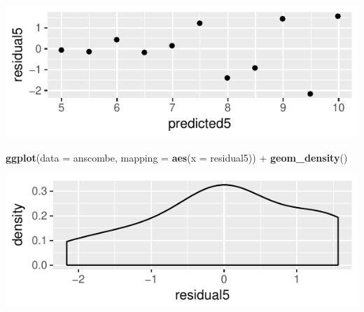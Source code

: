\documentclass[]{article}
\newenvironment{Shaded}{\begin{snugshade}}{\end{snugshade}}
\newcommand{\KeywordTok}[1]{\textcolor[rgb]{0.13,0.29,0.53}{\textbf{{#1}}}}
\newcommand{\DataTypeTok}[1]{\textcolor[rgb]{0.13,0.29,0.53}{{#1}}}
\newcommand{\StringTok}[1]{\textcolor[rgb]{0.31,0.60,0.02}{{#1}}}
\newcommand{\NormalTok}[1]{{#1}}
\begin{document}
\begin{Shaded}
\end{Shaded}

\includegraphics{20180417_anscombe_residuals_files/figure-latex/unnamed-chunk-16-1.pdf}

\begin{Shaded}
\begin{Highlighting}[]
\KeywordTok{ggplot}\NormalTok{(}\DataTypeTok{data =} \NormalTok{anscombe, }\DataTypeTok{mapping =} \KeywordTok{aes}\NormalTok{(}\DataTypeTok{x =} \NormalTok{residual5)) +}
\StringTok{  }\KeywordTok{geom_density}\NormalTok{()}
\end{Highlighting}
\end{Shaded}

\includegraphics{20180417_anscombe_residuals_files/figure-latex/unnamed-chunk-17-1.pdf}
\end{document}
